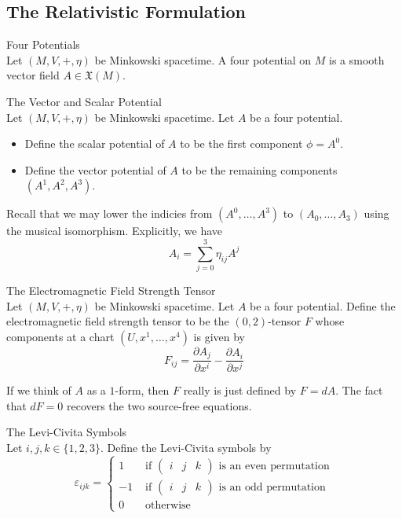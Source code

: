 \documentclass[a4paper]{article}
\begin{document}
\subsection{The Relativistic Formulation}
\begin{defn}{Four Potentials}{}\\
Let $(M,V,+,\eta)$ be Minkowski spacetime. A four potential on $M$ is a smooth vector field $A\in\mathfrak{X}(M)$. 
\end{defn}

\begin{defn}{The Vector and Scalar Potential}{}\\
Let $(M,V,+,\eta)$ be Minkowski spacetime. Let $A$ be a four potential. 
\begin{itemize}
\item Define the scalar potential of $A$ to be the first component $\phi=A^0$. 
\item Define the vector potential of $A$ to be the remaining components $(A^1,A^2,A^3)$. 
\end{itemize}
\end{defn}

Recall that we may lower the indicies from $(A^0,\dots,A^3)$ to $(A_0,\dots,A_3)$ using the musical isomorphism. Explicitly, we have $$A_i=\sum_{j=0}^3\eta_{ij}A^j$$

\begin{defn}{The Electromagnetic Field Strength Tensor}{}\\
Let $(M,V,+,\eta)$ be Minkowski spacetime. Let $A$ be a four potential. Define the electromagnetic field strength tensor to be the $(0,2)$-tensor $F$ whose components at a chart $(U,x^1,\dots,x^4)$ is given by $$F_{ij}=\frac{\partial A_j}{\partial x^i}-\frac{\partial A_i}{\partial x^j}$$
\end{defn}

If we think of $A$ as a $1$-form, then $F$ really is just defined by $F=dA$. The fact that $dF=0$ recovers the two source-free equations. 

\begin{defn}{The Levi-Civita Symbols}{}\\
Let $i,j,k\in\{1,2,3\}$. Define the Levi-Civita symbols by $$\varepsilon_{ijk}=\begin{cases}
1 & \text{ if }\begin{pmatrix}i & j & k\end{pmatrix}\text{ is an even permutation}\\
-1 & \text{ if }\begin{pmatrix}i & j & k\end{pmatrix}\text{ is an odd permutation}\\
0 & \text{ otherwise }
\end{cases}$$
\end{defn}
\end{document}
